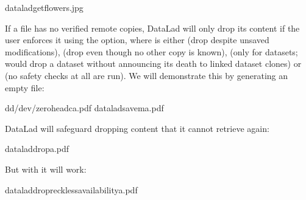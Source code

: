 \begin{sphinxVerbatim}[commandchars=\\\{\}]
dataladgetflowers.jpg
\end{sphinxVerbatim}

\sphinxAtStartPar
If a file has no verified remote copies, DataLad will only drop its
content if the user enforces it using the  option, where \sphinxcode{\sphinxupquote{{[}MODE{]}}} is either  (drop despite unsaved modifications),  (drop even though no other copy is known),  (only for datasets; would drop a dataset without announcing its death to linked dataset clones) or  (no safety checks at all are run).
We will demonstrate this by generating an empty file:

\begin{sphinxVerbatim}[commandchars=\\\{\}]
dd/dev/zerohead\PYGZhy{}c\PYGZgt{}a.pdf
dataladsave\PYGZhy{}ma.pdf
\end{sphinxVerbatim}

\sphinxAtStartPar
DataLad will safeguard dropping content that it cannot retrieve again:

\begin{sphinxVerbatim}[commandchars=\\\{\}]
dataladdropa.pdf
\end{sphinxVerbatim}

\sphinxAtStartPar
But with  it will work:

\begin{sphinxVerbatim}[commandchars=\\\{\}]
dataladdrop\PYGZhy{}\PYGZhy{}recklessavailabilitya.pdf
\end{sphinxVerbatim}

